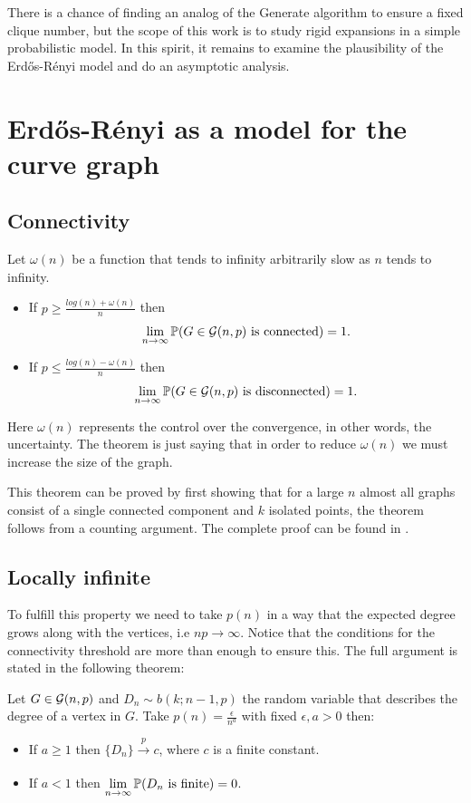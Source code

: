 There is a chance of finding an analog of the Generate algorithm to ensure a fixed clique number, but the scope of this work is to study rigid expansions in a simple probabilistic model. In this spirit, it remains to examine the plausibility of the Erdős-Rényi model and do an asymptotic analysis.

\section{Erdős-Rényi as a model for the curve graph}

\subsection{Connectivity}
\begin{theorem}\label{connectivityER}
Let $\omega(n)$ be a function that tends to infinity arbitrarily slow as $n$ tends to infinity.
\begin{itemize}
\item If $p\geq \frac{log(n)+ \omega(n)}{n}$ then 
$$\lim_{n \to \infty} \P(G \in \G(n,p) \text{ is connected}) = 1.$$
\item If $p\leq \frac{log(n)- \omega(n)}{n}$ then
$$\lim_{n \to \infty} \P(G \in \G(n,p) \text{ is disconnected}) = 1.$$
\end{itemize}
\end{theorem}
Here $\omega(n)$ represents the control over the convergence, in other words, the uncertainty. The theorem is just saying that in order to reduce $\omega(n)$ we must increase the size of the graph.

This theorem can be proved by first showing that for a large $n$ almost all graphs consist of a single connected component and $k$ isolated points, the theorem follows from a counting argument. The complete proof can be found in \cite[Erdős-Rényi, p.~59]{Erdos59}.
 
\subsection{Locally infinite}

To fulfill this property we need to take $p(n)$ in a way that the expected degree grows along with the vertices, i.e $n p\to \infty$. Notice that the conditions for the connectivity threshold are more than enough to ensure this. The full argument is stated in the following theorem:

\begin{theorem}\label{locallyInfiniteER}
Let $G \in \G(n,p)$ and $D_{n} \sim b(k; n-1,p)$ the random variable that describes the degree of a vertex in $G$. Take $p(n)=\frac{\epsilon}{n^{a}}$ with fixed $\epsilon,a >0$ then:
\begin{itemize}
    \item If $a\geq 1$ then $\{D_{n}\} \xrightarrow[]{p} c $, where $c$ is a finite constant.
    \item If $a<1$ then $\lim\limits_{n \to \infty} \P(D_n \text{ is finite}) = 0$.
\end{itemize}
\end{theorem}

